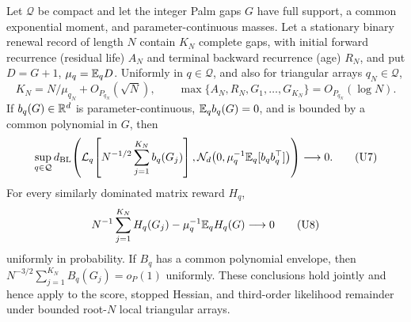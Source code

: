\begin{lemma}
\label{lem:uniform-stopped-renewal-score-main}
Let \(\mathcal Q\) be compact and let the integer Palm gaps \(G\) have full
support, a common exponential moment, and parameter-continuous masses.  Let a
stationary binary renewal record of length \(N\) contain \(K_N\) complete
gaps, with initial forward recurrence (residual life) \(A_N\) and terminal
backward recurrence (age) \(R_N\), and put
\(D=G+1\), \(\mu_q=\mathbb{E}_qD\).  Uniformly in \(q\in\mathcal Q\), and also for
triangular arrays \(q_N\in\mathcal Q\),
\[
 K_N=N/\mu_{q_N}+O_{P_{q_N}}(\sqrt N),
\qquad
 \max\{A_N,R_N,G_1,\ldots,G_{K_N}\}=O_{P_{q_N}}(\log N).
\tag{U6}
\]
If \(b_q(G)\in\mathbb{R}^d\) is parameter-continuous,
\(\mathbb{E}_qb_q(G)=0\), and is bounded by a common polynomial in \(G\), then
\[
 \sup_{q\in\mathcal Q}d_{\rm BL}\!\left(
 \mathcal L_q\!\left[N^{-1/2}\sum_{j=1}^{K_N}b_q(G_j)\right],
 \mathcal N_d\!\left(0,\mu_q^{-1}\mathbb{E}_q[b_qb_q^\top]\right)
 \right)\longrightarrow0.
\tag{U7}
\]
For every similarly dominated matrix reward \(H_q\),
\[
 N^{-1}\sum_{j=1}^{K_N}H_q(G_j)
 -\mu_q^{-1}\mathbb{E}_qH_q(G)\longrightarrow0
\tag{U8}
\]
uniformly in probability.  If \(B_q\) has a common polynomial envelope, then
\(N^{-3/2}\sum_{j=1}^{K_N}B_q(G_j)=o_P(1)\) uniformly.  These conclusions
hold jointly and hence apply to the score, stopped Hessian, and third-order
likelihood remainder under bounded root-\(N\) local triangular arrays.
\end{lemma}

